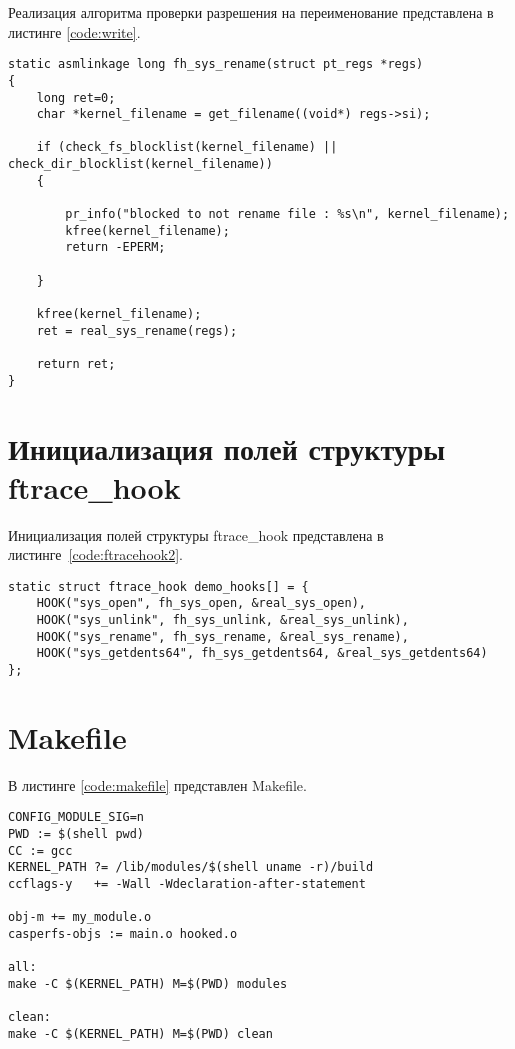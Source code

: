 Реализация алгоритма проверки разрешения на переименование представлена в листинге \ref{code:write}.

\begin{lstlisting}[label=code:write,caption=Реализация алгоритма проверки разрешения на запись в файл]
static asmlinkage long fh_sys_rename(struct pt_regs *regs)
{
    long ret=0;
    char *kernel_filename = get_filename((void*) regs->si);

    if (check_fs_blocklist(kernel_filename) || check_dir_blocklist(kernel_filename))
    {

        pr_info("blocked to not rename file : %s\n", kernel_filename);
        kfree(kernel_filename);
        return -EPERM;

    }

    kfree(kernel_filename);
    ret = real_sys_rename(regs);

    return ret;
}
\end{lstlisting}

\section{Инициализация полей структуры ftrace\_hook}

Инициализация полей структуры ftrace\_hook представлена в листинге~\ref{code:ftracehook2}.

\begin{lstlisting}[label=code:ftracehook2,caption=Инициализация полей структуры ftrace\_hook]
static struct ftrace_hook demo_hooks[] = {
    HOOK("sys_open", fh_sys_open, &real_sys_open),
    HOOK("sys_unlink", fh_sys_unlink, &real_sys_unlink),
    HOOK("sys_rename", fh_sys_rename, &real_sys_rename),
    HOOK("sys_getdents64", fh_sys_getdents64, &real_sys_getdents64)
};
\end{lstlisting}

\section{Makefile}

В листинге \ref{code:makefile} представлен Makefile.

\begin{lstlisting}[label=code:makefile,caption=Makefile]
CONFIG_MODULE_SIG=n
PWD := $(shell pwd)
CC := gcc
KERNEL_PATH ?= /lib/modules/$(shell uname -r)/build
ccflags-y	+= -Wall -Wdeclaration-after-statement

obj-m += my_module.o
casperfs-objs := main.o hooked.o 

all:
make -C $(KERNEL_PATH) M=$(PWD) modules

clean:
make -C $(KERNEL_PATH) M=$(PWD) clean
\end{lstlisting}
